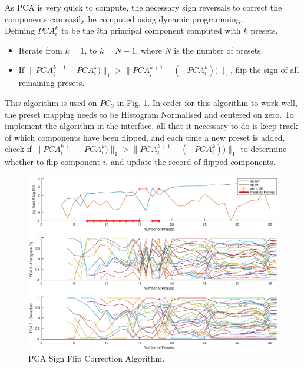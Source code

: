 \documentclass[11pt, oneside]{report}   	%
\begin{document}
As PCA is very quick to compute, the necessary sign reversals to correct the components can easily be computed using dynamic programming.\\ Defining $PCA_i^k$ to be the $i$th principal component computed with $k$ presets.
\begin{itemize}
		\setlength\itemsep{-1.2em}
	\item 
Iterate from $k = 1$, to $k = N-1$, where $N$ is the number of presets.
	\item 
If $\|PCA_i^{k+1} - PCA_i^k)\|_1 > \|PCA_i^{k+1} - (-PCA_i^k))\|_1$,  flip the sign of all remaining presets.
\end{itemize}
This algorithm is used on $PC_3$ in Fig. \ref{fig:PCAnumPresets2}. In order for this algorithm to work well, the preset mapping needs to be Histogram Normalised and centered on zero. To implement the algorithm in the interface, all that it necessary to do is keep track of which components have been flipped, and each time a new preset is added, check if $\|PCA_i^{k+1} - PCA_i^k)\|_1 > \|PCA_i^{k+1} - (-PCA_i^k))\|_1$ to determine whether to flip component $i$, and update the record of flipped components. 

\begin{figure}
	\hspace{-40pt}
	\includegraphics[trim={0, 1cm, 0, 1.5cm}, clip, width = 7in]{PCAnumPresets2.eps}
	\caption{PCA Sign Flip Correction Algorithm.}
	\label{fig:PCAnumPresets2}
	\vspace{-10pt}
\end{figure}
\end{document}
